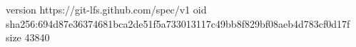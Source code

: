 version https://git-lfs.github.com/spec/v1
oid sha256:694d87e36374681bca2de51f5a733013117c49bb8f829bf08aeb4d783cf0d17f
size 43840
